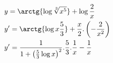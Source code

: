 \begin{ex}
\begin{align}
&y=\arctg{\log{\sqrt[3]{x^5}}}+\log{\frac{2}{x}}\nonumber\\
&y'=\arctg{\log{x\frac{5}{3}}}+\frac{x}{2}.\left(-\frac{2}{x^2}\right)\nonumber\\
&y'=\frac{1}{1+\left(\frac{5}{3}\log{x}\right)^2}.\frac{5}{3}.\frac{1}{x}-\frac{1}{x}\nonumber
\end{align}
\end{ex}